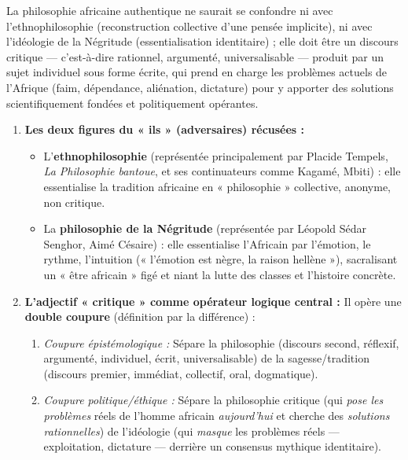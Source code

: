 \documentclass[11pt]{article}
\newcommand{\cle}[1]{{\popxbold\color{popdark}#1}}
\begin{document}
\begin{corrige}
La philosophie africaine authentique ne saurait se confondre ni avec l'ethnophilosophie (reconstruction collective d'une pensée implicite), ni avec l'idéologie de la Négritude (essentialisation identitaire) ; elle doit être un \cle{discours critique} — c'est-à-dire rationnel, argumenté, universalisable — produit par un sujet \cle{individuel} sous forme \cle{écrite}, qui prend en charge les \cle{problèmes actuels} de l'Afrique (faim, dépendance, aliénation, dictature) pour y apporter des solutions scientifiquement fondées et politiquement opérantes.
\end{corrige}

\begin{corrige}
\begin{enumerate}
\item \textbf{Les deux figures du « ils » (adversaires) récusées :}
\begin{itemize}
\item L'\textbf{ethnophilosophie} (représentée principalement par Placide Tempels, \emph{La Philosophie bantoue}, et ses continuateurs comme Kagamé, Mbiti) : elle essentialise la tradition africaine en « philosophie » collective, anonyme, non critique.
\item La \textbf{philosophie de la Négritude} (représentée par Léopold Sédar Senghor, Aimé Césaire) : elle essentialise l'Africain par l'émotion, le rythme, l'intuition (« l'émotion est nègre, la raison hellène »), sacralisant un « être africain » figé et niant la lutte des classes et l'histoire concrète.
\end{itemize}
\item \textbf{L'adjectif « critique » comme opérateur logique central :} Il opère une \textbf{double coupure} (définition par la différence) :
\begin{enumerate}
\item \emph{Coupure épistémologique :} Sépare la \cle{philosophie} (discours second, réflexif, argumenté, individuel, écrit, universalisable) de la \cle{sagesse/tradition} (discours premier, immédiat, collectif, oral, dogmatique).
\item \emph{Coupure politique/éthique :} Sépare la \cle{philosophie critique} (qui \emph{pose les problèmes} réels de l'homme africain \emph{aujourd'hui} et cherche des \emph{solutions rationnelles}) de l'\cle{idéologie} (qui \emph{masque} les problèmes réels — exploitation, dictature — derrière un consensus mythique identitaire).

\end{enumerate}
\end{enumerate}
\end{corrige}
\end{document}
